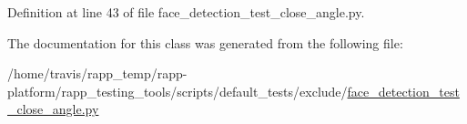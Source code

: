 Definition at line 43 of file face\-\_\-detection\-\_\-test\-\_\-close\-\_\-angle.\-py.



The documentation for this class was generated from the following file\-:\begin{DoxyCompactItemize}
\item 
/home/travis/rapp\-\_\-temp/rapp-\/platform/rapp\-\_\-testing\-\_\-tools/scripts/default\-\_\-tests/exclude/\hyperlink{face__detection__test__close__angle_8py}{face\-\_\-detection\-\_\-test\-\_\-close\-\_\-angle.\-py}\end{DoxyCompactItemize}
